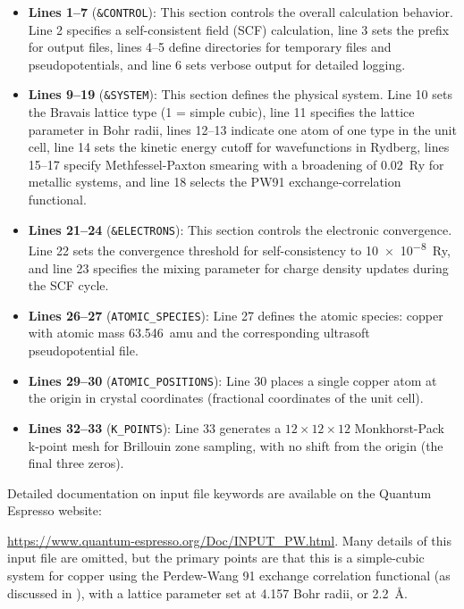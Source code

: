 \begin{itemize}
\item \textbf{Lines 1--7} (\texttt{\&CONTROL}): This section controls
  the overall calculation behavior. Line 2 specifies a
  self-consistent field (SCF) calculation, line 3 sets the prefix for
  output files, lines 4--5 define directories for temporary files and
  pseudopotentials, and line 6 sets verbose output for detailed logging.

\item \textbf{Lines 9--19} (\texttt{\&SYSTEM}): This section defines
  the physical system. Line 10 sets the Bravais lattice type (1 =
  simple cubic), line 11 specifies the lattice parameter in Bohr
  radii, lines 12--13 indicate one atom of one type in the unit cell,
  line 14 sets the kinetic energy cutoff for wavefunctions in
  Rydberg, lines 15--17 specify Methfessel-Paxton smearing with a
  broadening of \SI{0.02}{Ry} for metallic systems, and line 18 selects the
  PW91 exchange-correlation functional.

\item \textbf{Lines 21--24} (\texttt{\&ELECTRONS}): This section
  controls the electronic convergence. Line 22 sets the convergence
  threshold for self-consistency to \SI{10e-8}{Ry}, and line 23
  specifies the mixing parameter for charge density updates during
  the SCF cycle.

\item \textbf{Lines 26--27} (\texttt{ATOMIC\_SPECIES}): Line 27
  defines the atomic species: copper with atomic mass \SI{63.546}{amu} and
  the corresponding ultrasoft pseudopotential file.

\item \textbf{Lines 29--30} (\texttt{ATOMIC\_POSITIONS}): Line 30
  places a single copper atom at the origin in crystal coordinates
  (fractional coordinates of the unit cell).

\item \textbf{Lines 32--33} (\texttt{K\_POINTS}): Line 33 generates a
  $12 \times 12 \times 12$ Monkhorst-Pack k-point mesh for Brillouin
  zone sampling, with no shift from the origin (the final three zeros).
\end{itemize}

Detailed documentation on input file keywords are available on the
Quantum Espresso
website: \par
\href{https://www.quantum-espresso.org/Doc/INPUT_PW.html}{https://www.quantum-espresso.org/Doc/INPUT\_PW.html}.
Many details of this input file are omitted, but the primary points
are that this is a simple-cubic system for copper using the
Perdew-Wang 91 exchange
correlation functional (as
discussed in ), with a lattice parameter set at
\num{4.157} Bohr radii, or \SI{2.2}{\angstrom}.

